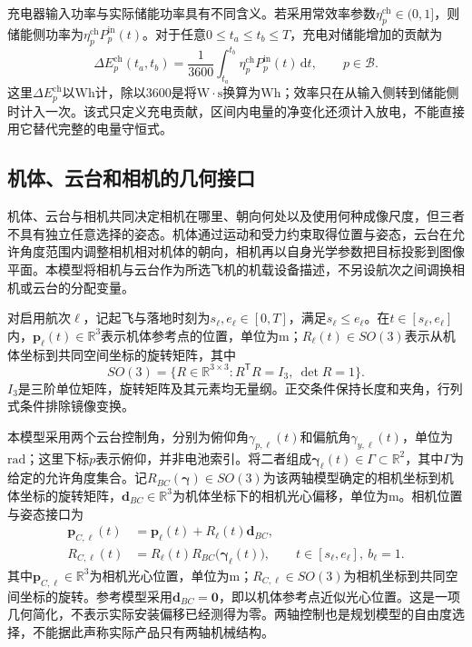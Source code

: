 充电器输入功率与实际储能功率具有不同含义。若采用常效率参数$\eta_p^{\mathrm{ch}}\in(0,1]$，则储能侧功率为$\eta_p^{\mathrm{ch}}P_p^{\mathrm{in}}(t)$。对于任意$0\le t_a\le t_b\le T$，充电对储能增加的贡献为
\begin{equation}
 \Delta E_p^{\mathrm{ch}}(t_a,t_b)
 =\frac{1}{3600}\int_{t_a}^{t_b}
 \eta_p^{\mathrm{ch}}P_p^{\mathrm{in}}(t)\,\mathrm dt,
 \qquad p\in\mathcal B.
 \label{s0402:charging_energy_interface}
\end{equation}
这里$\Delta E_p^{\mathrm{ch}}$以$\mathrm{Wh}$计，除以3600是将$\mathrm W\cdot\mathrm s$换算为$\mathrm{Wh}$；效率只在从输入侧转到储能侧时计入一次。该式只定义充电贡献，区间内电量的净变化还须计入放电，不能直接用它替代完整的电量守恒式。

\subsection{机体、云台和相机的几何接口}

机体、云台与相机共同决定相机在哪里、朝向何处以及使用何种成像尺度，但三者不具有独立任意选择的姿态。机体通过运动和受力约束取得位置与姿态，云台在允许角度范围内调整相机相对机体的朝向，相机再以自身光学参数把目标投影到图像平面。本模型将相机与云台作为所选飞机的机载设备描述，不另设航次之间调换相机或云台的分配变量。

对启用航次$\ell$，记起飞与落地时刻为$s_\ell,e_\ell\in[0,T]$，满足$s_\ell\le e_\ell$。在$t\in[s_\ell,e_\ell]$内，$\mathbf p_\ell(t)\in\mathbb R^3$表示机体参考点的位置，单位为$\mathrm m$；$R_\ell(t)\in SO(3)$表示从机体坐标到共同空间坐标的旋转矩阵，其中
\begin{equation}
 SO(3)=\{R\in\mathbb R^{3\times3}:
 R^{\mathsf T}R=I_3,\ \det R=1\}.
 \label{s0402:rotation_domain}
\end{equation}
$I_3$是三阶单位矩阵，旋转矩阵及其元素均无量纲。正交条件保持长度和夹角，行列式条件排除镜像变换。

本模型采用两个云台控制角，分别为俯仰角$\gamma_{p,\ell}(t)$和偏航角$\gamma_{y,\ell}(t)$，单位为$\mathrm{rad}$；这里下标$p$表示俯仰，并非电池索引。将二者组成$\boldsymbol\gamma_\ell(t)\in\Gamma\subset\mathbb R^2$，其中$\Gamma$为给定的允许角度集合。记$R_{BC}(\boldsymbol\gamma)\in SO(3)$为该两轴模型确定的相机坐标到机体坐标的旋转矩阵，$\mathbf d_{BC}\in\mathbb R^3$为机体坐标下的相机光心偏移，单位为$\mathrm m$。相机位置与姿态接口为
\begin{align}
 \mathbf p_{C,\ell}(t)
 &=\mathbf p_\ell(t)+R_\ell(t)\mathbf d_{BC},
 \label{s0402:camera_position}\\
 R_{C,\ell}(t)
 &=R_\ell(t)R_{BC}\bigl(\boldsymbol\gamma_\ell(t)\bigr),
 \qquad t\in[s_\ell,e_\ell],\ b_\ell=1.
 \label{s0402:camera_orientation}
\end{align}
其中$\mathbf p_{C,\ell}\in\mathbb R^3$为相机光心位置，单位为$\mathrm m$；$R_{C,\ell}\in SO(3)$为相机坐标到共同空间坐标的旋转。参考模型采用$\mathbf d_{BC}=\mathbf0$，即以机体参考点近似光心位置。这是一项几何简化，不表示实际安装偏移已经测得为零。两轴控制也是规划模型的自由度选择，不能据此声称实际产品只有两轴机械结构。

